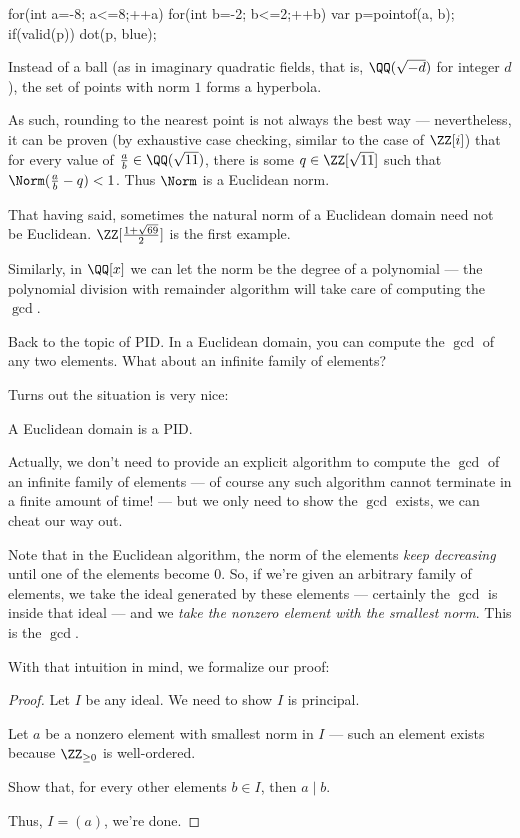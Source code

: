 \begin{example}
\begin{center}
\begin{asy}
		for(int a=-8; a<=8;++a){
			for(int b=-2; b<=2;++b){
				var p=pointof(a, b);
				if(valid(p)) dot(p, blue);
			}
		}
	\end{asy}
	\end{center}

	Instead of a ball (as in imaginary quadratic fields, that is, $\QQ(\sqrt{-d})$ for integer $d$),
	the set of points with norm $1$ forms a hyperbola.

	As such, rounding to the nearest point is not always the best way --- nevertheless, it can be
	proven (by exhaustive case checking, similar to the case of $\ZZ[i]$) that for every value of
	$\frac{a}{b} \in \QQ(\sqrt{11})$, there is some $q \in \ZZ[\sqrt{11}]$ such that
	$\Norm(\frac{a}{b}-q) < 1$. Thus $\Norm$ is a Euclidean norm.
\end{example}

That having said, sometimes the natural norm of a Euclidean domain need not be Euclidean.
$\ZZ[\frac{1 + \sqrt{69}}{2}]$ is the first example.

\begin{example}
	Similarly, in $\QQ[x]$ we can let the norm be the degree of a polynomial --- the polynomial
	division with remainder algorithm will take care of computing the $\gcd$.
\end{example}

Back to the topic of PID. In a Euclidean domain, you can compute the $\gcd$ of any two elements.
What about an infinite family of elements?

Turns out the situation is very nice:
\begin{proposition}
	A Euclidean domain is a PID.
\end{proposition}
Actually, we don't need to provide an explicit algorithm to compute the $\gcd$ of an infinite family
of elements --- of course any such algorithm cannot terminate in a finite amount of time! --- but we
only need to show the $\gcd$ exists, we can cheat our way out.

Note that in the Euclidean algorithm, the norm of the elements \emph{keep decreasing} until one of
the elements become $0$. So, if we're given an arbitrary family of elements, we take the ideal
generated by these elements --- certainly the $\gcd$ is inside that ideal --- and we \emph{take the
nonzero element with the smallest norm}. This is the $\gcd$.

With that intuition in mind, we formalize our proof:
\begin{proof}
	Let $I$ be any ideal. We need to show $I$ is principal.

	Let $a$ be a nonzero element with smallest norm in $I$ --- such an element exists because
	$\ZZ_{\geq 0}$ is well-ordered.
	\begin{ques}
		Show that, for every other elements $b \in I$, then $a \mid b$.
	\end{ques}
	Thus, $I = (a)$, we're done.
\end{proof}


